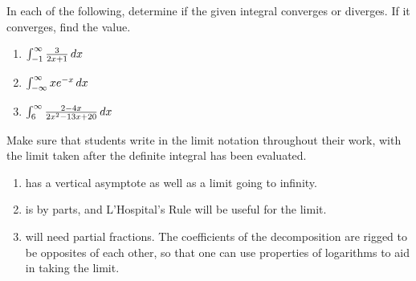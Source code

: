 \documentclass[]{ximera}
\begin{document}
\begin{instructorNotes}

\end{instructorNotes}








\begin{problem}
In each of the following, determine if the given integral converges or diverges.  
If it converges, find the value.

	\begin{enumerate}
	
	\item  $\int_{-1}^{\infty} \frac{3}{2x+1} \,d x$
	\begin{freeResponse}
	
	\end{freeResponse}
	
	
	
	\item  $\int_{-\infty}^{\infty} x e^{-x} \,d x$
	\begin{freeResponse}
	
	\end{freeResponse}
	
	
	
	\item  $\int_6^{\infty} \frac{2-4x}{2x^2 - 13x + 20} \,d x$
	\begin{freeResponse}
	
	\end{freeResponse}
	
	\end{enumerate}
	
\end{problem}

\begin{instructorNotes}
Make sure that students write in the limit notation throughout their work, with the limit taken after the definite integral has been evaluated.
	\begin{enumerate}
	\item has a vertical asymptote as well as a limit going to infinity.
	\item is by parts, and L'Hospital's Rule will be useful for the limit.
	\item will need partial fractions.  
	The coefficients of the decomposition are rigged to be opposites of each other, so that one can use properties of logarithms to aid in taking the limit.
	\end{enumerate}
\end{instructorNotes}
\end{document}
